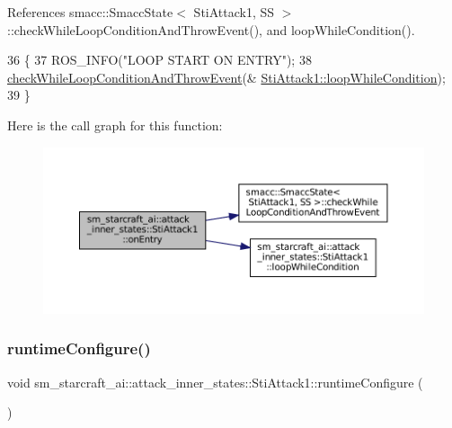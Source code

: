 References smacc\+::\+Smacc\+State$<$ Sti\+Attack1, S\+S $>$\+::check\+While\+Loop\+Condition\+And\+Throw\+Event(), and loop\+While\+Condition().


\begin{DoxyCode}
36   \{
37     ROS\_INFO(\textcolor{stringliteral}{"LOOP START ON ENTRY"});
38     \hyperlink{classsmacc_1_1SmaccState_a80082718f226bebedb589f0c4696001d}{checkWhileLoopConditionAndThrowEvent}(&
      \hyperlink{structsm__starcraft__ai_1_1attack__inner__states_1_1StiAttack1_a19b7c513e8353cf16983dad2c18d6aea}{StiAttack1::loopWhileCondition});
39   \}
\end{DoxyCode}
Here is the call graph for this function\+:
\nopagebreak
\begin{figure}[H]
\begin{center}
\leavevmode
\includegraphics[width=350pt]{structsm__starcraft__ai_1_1attack__inner__states_1_1StiAttack1_a7e67ac9316c3f465eccc32e74012ddf5_cgraph}
\end{center}
\end{figure}
\mbox{\label{structsm__starcraft__ai_1_1attack__inner__states_1_1StiAttack1_a9307ca96add505ae839b0f74368474e5}} 
\subsubsection{\texorpdfstring{runtime\+Configure()}{runtimeConfigure()}}
{\footnotesize\ttfamily void sm\+\_\+starcraft\+\_\+ai\+::attack\+\_\+inner\+\_\+states\+::\+Sti\+Attack1\+::runtime\+Configure (\begin{DoxyParamCaption}{ }\end{DoxyParamCaption})\hspace{0.3cm}{\ttfamily [inline]}}



